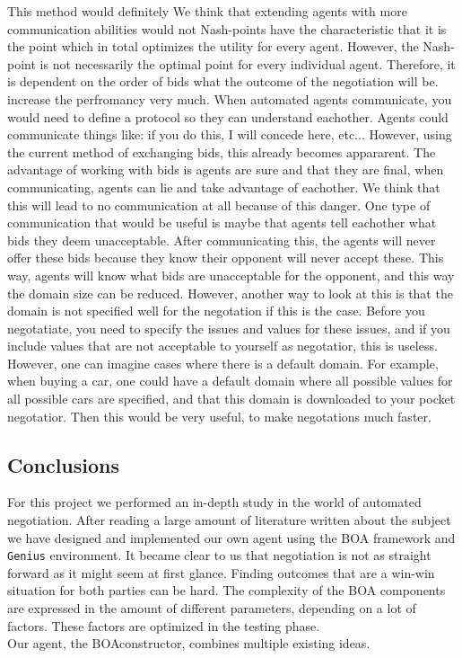 This method would definitely 
We think that extending agents with more communication abilities would not 
Nash-points have the characteristic that it is the point which in total optimizes the utility for every agent. However, the Nash-point is not necessarily the optimal point for every individual agent. Therefore, it is dependent on the order of bids what the outcome of the negotiation will be. 
increase the perfromancy very much. When automated agents communicate,
you would need to define a protocol so they can understand eachother.
Agents could communicate things like: if you do this, I will concede here, etc...
However, using the current method of exchanging bids, this already becomes 
appararent. The advantage of working with bids is agents are sure and that they are final,
when communicating, agents can lie and take advantage of eachother. 
We think that this will lead to no communication at all because of this danger.
One type of communication that would be useful is maybe that agents
tell eachother what bids they deem unacceptable. 
After communicating this, the agents will never offer these bids because they know
their opponent will never accept these. This way, 
agents will know what bids are unacceptable for the opponent, and this way
the domain size can be reduced. 
However, another way to look at this is that the domain is not specified well for the 
negotation if this is the case. Before you negotatiate, you need to specify the issues
and values for these issues, and if you include values that are not acceptable to 
yourself as negotatior, this is useless. However, one can imagine cases where
there is a default domain. For example, when buying a car, one could have a default domain
where all possible values for all possible cars are specified, and that this domain is 
downloaded to your pocket negotatior. Then this would be very useful,
to make negotations much faster.



\subsection{Conclusions}

For this project we performed an in-depth study in the world of automated negotiation. After reading a large amount of literature written about the subject we have designed and implemented our own agent using the BOA framework and \texttt{Genius} environment. It became clear to us that negotiation is not as straight forward as it might seem at first glance. Finding outcomes that are a win-win situation for both parties can be hard. The complexity of the BOA components are expressed in the amount of different parameters, depending on a lot of factors. These factors are optimized in the testing phase.  \\

Our agent, the BOAconstructor, combines multiple existing ideas.


